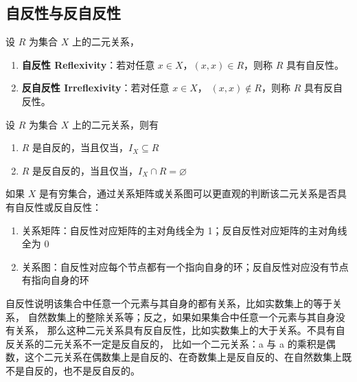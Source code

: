 \subsection{自反性与反自反性}

\begin{definition}
    设 $ R $ 为集合 $ X $ 上的二元关系，
    \begin{enumerate}
        \item \textbf{自反性 Reflexivity}：若对任意 $ x\in X $，$ (x,x)\in R $，则称 $ R $ 具有自反性。
        \item \textbf{反自反性 Irreflexivity}：若对任意 $ x\in X $， $ (x,x)\notin R $，则称 $ R $ 具有反自反性。
    \end{enumerate}
\end{definition}

\begin{proposition}
    设 $ R $ 为集合 $ X $ 上的二元关系，则有
    \begin{enumerate}
        \item $ R $ 是自反的，当且仅当，$ I_X \subseteq R $
        \item $ R $ 是反自反的，当且仅当，$ I_X \cap R = \varnothing $
    \end{enumerate}
\end{proposition}

\begin{note}
    如果 $ X $ 是有穷集合，通过关系矩阵或关系图可以更直观的判断该二元关系是否具有自反性或反自反性：
    \begin{enumerate}
        \item 关系矩阵：自反性对应矩阵的主对角线全为 1；反自反性对应矩阵的主对角线全为 0
        \item 关系图：自反性对应每个节点都有一个指向自身的环；反自反性对应没有节点有指向自身的环
    \end{enumerate}
    自反性说明该集合中任意一个元素与其自身的都有关系，比如实数集上的等于关系，
    自然数集上的整除关系等；反之，如果如果集合中任意一个元素与其自身没有关系，
    那么这种二元关系具有反自反性，比如实数集上的大于关系。不具有自反关系的二元关系不一定是反自反的，
    比如一个二元关系：a 与 a 的乘积是偶数，这个二元关系在偶数集上是自反的、在奇数集上是反自反的、在自然数集上既不是自反的，也不是反自反的。
\end{note}

\newpage